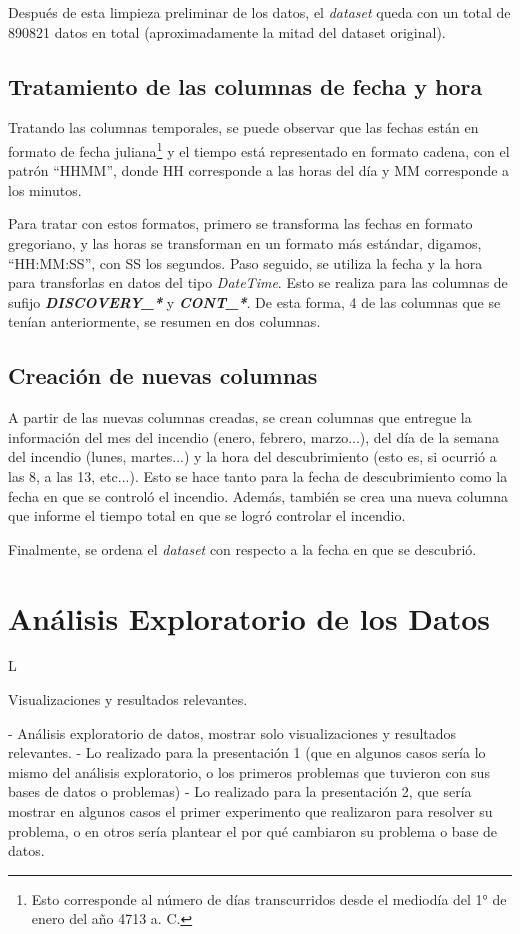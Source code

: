 Después de esta limpieza preliminar de los datos, el \textit{dataset} queda con un total de 890821 datos en total (aproximadamente la mitad del dataset original).

\subsection{Tratamiento de las columnas de fecha y hora}
Tratando las columnas temporales, se puede observar que las fechas están en formato de fecha juliana\footnote{Esto corresponde al número de días transcurridos desde el mediodía del 1° de enero del año 4713 a. C.} y el tiempo está representado en formato cadena, con el patrón ``HHMM'', donde HH corresponde a las horas del día y MM corresponde a los minutos. 

Para tratar con estos formatos, primero se transforma las fechas en formato gregoriano, y las horas se transforman en un formato más estándar, digamos, ``HH:MM:SS'', con SS los segundos. Paso seguido, se utiliza la fecha y la hora para transforlas en datos del tipo \textit{DateTime}. Esto se realiza para las columnas de sufijo \textit{\textbf{DISCOVERY\_*}} y \textit{\textbf{CONT\_*}}. De esta forma, 4 de las columnas que se tenían anteriormente, se resumen en dos columnas.

\subsection{Creación de nuevas columnas}
A partir de las nuevas columnas creadas, se crean columnas que entregue la información del mes del incendio (enero, febrero, marzo...), del día de la semana del incendio (lunes, martes...) y la hora del descubrimiento (esto es, si ocurrió a las 8, a las 13, etc...). Esto se hace tanto para la fecha de descubrimiento como la fecha en que se controló el incendio. Además, también se crea una nueva columna que informe el tiempo total en que se logró controlar el incendio. 

Finalmente, se ordena el \textit{dataset} con respecto a la fecha en que se descubrió.

\section{Análisis Exploratorio de los Datos}
L

Visualizaciones y resultados relevantes.

- Análisis exploratorio de datos, mostrar solo visualizaciones y resultados relevantes.
- Lo realizado para la presentación 1 (que en algunos casos sería lo mismo del análisis exploratorio, o los primeros problemas que tuvieron con sus bases de datos o problemas)
- Lo realizado para la presentación 2, que sería mostrar en algunos casos el primer experimento que realizaron para resolver su problema, o en otros sería plantear el por qué cambiaron su problema o base de datos.